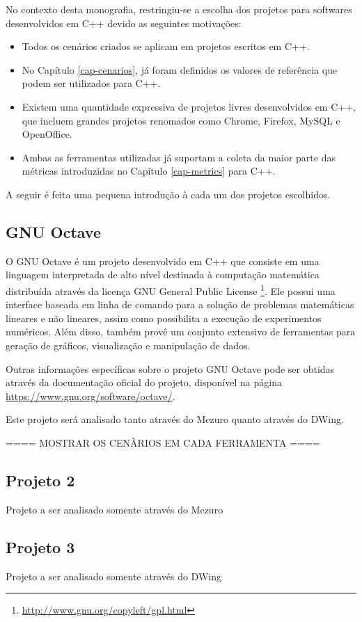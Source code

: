 No contexto desta monografia, restringiu-se a escolha dos projetos para softwares desenvolvidos em C++ devido as seguintes motivações:

\begin{itemize}
\item Todos os cenários criados se aplicam em projetos escritos em C++.
\item No Capítulo \ref{cap-cenarios}, já foram definidos os valores de referência que podem ser utilizados para C++.
\item Existem uma quantidade expressiva de projetos livres desenvolvidos em C++, que incluem grandes projetos renomados como Chrome, Firefox, MySQL e OpenOffice.
\item Ambas as ferramentas utilizadas já suportam a coleta da maior parte das métricas introduzidas no Capítulo \ref{cap-metrics} para C++.
\end{itemize}

A seguir é feita uma pequena introdução à cada um dos projetos escolhidos.

\subsection{GNU Octave}
\label{section-octave}

O GNU Octave é um projeto desenvolvido em C++ que consiste em uma linguagem interpretada de alto nível destinada à computação matemática distribuída através da licença GNU General Public License \footnote{\url{http://www.gnu.org/copyleft/gpl.html}}. Ele possui uma interface baseada em linha de comando para a solução de problemas matemáticas lineares e não lineares, assim como possibilita a execução de experimentos numéricos. Além disso, também provê um conjunto extensivo de ferramentas para geração de gráficos, visualização e manipulação de dados.

Outras informações específicas sobre o projeto GNU Octave pode ser obtidas através da documentação oficial do projeto, disponível na página \url{https://www.gnu.org/software/octave/}.

Este projeto será analisado tanto através do Mezuro quanto através do DWing.


==== MOSTRAR OS CENÀRIOS EM CADA FERRAMENTA ====


\subsection{Projeto 2}
\label{}

Projeto a ser analisado somente através do Mezuro

\subsection{Projeto 3}
\label{}

Projeto a ser analisado somente através do DWing


